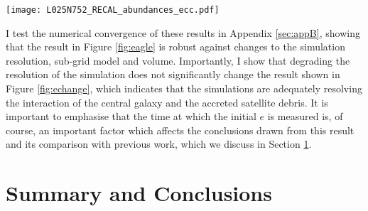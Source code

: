 \begin{figure*}
\texttt{[image: L025N752\_RECAL\_abundances\_ecc.pdf]}

\caption[The \mgfe{}-\feh{} abundances of the satellites accreted onto Milky Way mass haloes in the Recal-L025N0752 simulation of the EAGLE suite]{\label{fig:eagleabundances} Mean \mgfe{} and \feh{} of the
accreted satellites shown in Figures \ref{fig:eagle} and
\ref{fig:echange}. In both panels, point size and filling
indicate the number of particles of accreted systems, and morphology
of central galaxy, respectively, as in previous figures.  On the
right hand panel, colour denotes the masses of accreted satellites.
The same data are shown in the left hand panel, colour-coded by the
median eccentricity at $z=0$ of the debris.  The dashed and dotted
lines indicate roughly the locus of the disc stars of
MW-like central galaxies in the L025N752-Recal simulation \citep[see,
e.g.][]{2018MNRAS.477.5072M}. It is clear that the abundances of the stars in
the accreted satellites are roughly consistent with those seen in
halo stars in the APOGEE data (the median and 1$\sigma$ scatter of
the high $e$ group is shown by the black error bars).  Less massive
satellites have a large spread in \mgfe, but all have lower \feh{}
than the more massive satellites.  The increasing \feh{} with
satellite mass is very clear. The left hand panel shows that there
is a distinct lack of high eccentricity satellite debris at high
\mgfe{} and low \feh{}, such that, in general, high $e$ debris
occupies a similar locus to that of the high $e$ group in the
observed data.}

\end{figure*}

I test the numerical convergence of these results in Appendix
\ref{sec:appB}, showing that the result in Figure \ref{fig:eagle}
is robust against changes to the simulation resolution, sub-grid
model and volume. Importantly, I show that degrading the resolution
of the simulation does not significantly change the result shown
in Figure \ref{fig:echange}, which indicates that the simulations
are adequately resolving the interaction of the central galaxy and
the accreted satellite debris. It is important to emphasise that
the time at which the initial $e$ is measured is, of course, an
important factor which affects the conclusions drawn from this
result and its comparison with previous work, which we discuss 
in Section \ref{finale}.


\section{Summary and Conclusions} \label{finale}

